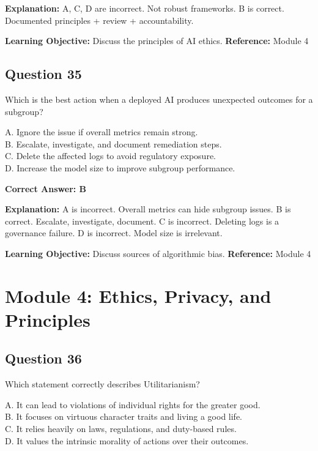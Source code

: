 \documentclass[11pt]{article}
\begin{document}
	\textbf{Explanation:}
	A, C, D are incorrect. Not robust frameworks.
	B is correct. Documented principles + review + accountability.
	
	\textbf{Learning Objective:} Discuss the principles of AI ethics.
	\textbf{Reference:} Module 4
	
	\subsection*{Question 35}
	Which is the best action when a deployed AI produces unexpected
	outcomes for a subgroup?
	
	A. Ignore the issue if overall metrics remain strong.\\
	B. Escalate, investigate, and document remediation steps.\\
	C. Delete the affected logs to avoid regulatory exposure.\\
	D. Increase the model size to improve subgroup performance.
	
	\vspace{0.4em}
	\textbf{Correct Answer: B}
	
	\textbf{Explanation:}
	A is incorrect. Overall metrics can hide subgroup issues.
	B is correct. Escalate, investigate, document.
	C is incorrect. Deleting logs is a governance failure.
	D is incorrect. Model size is irrelevant.
	
	\textbf{Learning Objective:} Discuss sources of algorithmic bias.
	\textbf{Reference:} Module 4
	
	\newpage
	\section{Module 4: Ethics, Privacy, and Principles}
	
	\subsection*{Question 36}
	Which statement correctly describes Utilitarianism?
	
	A. It can lead to violations of individual rights for the greater good.\\
	B. It focuses on virtuous character traits and living a good life.\\
	C. It relies heavily on laws, regulations, and duty-based rules.\\
	D. It values the intrinsic morality of actions over their outcomes.
	
\end{document}
